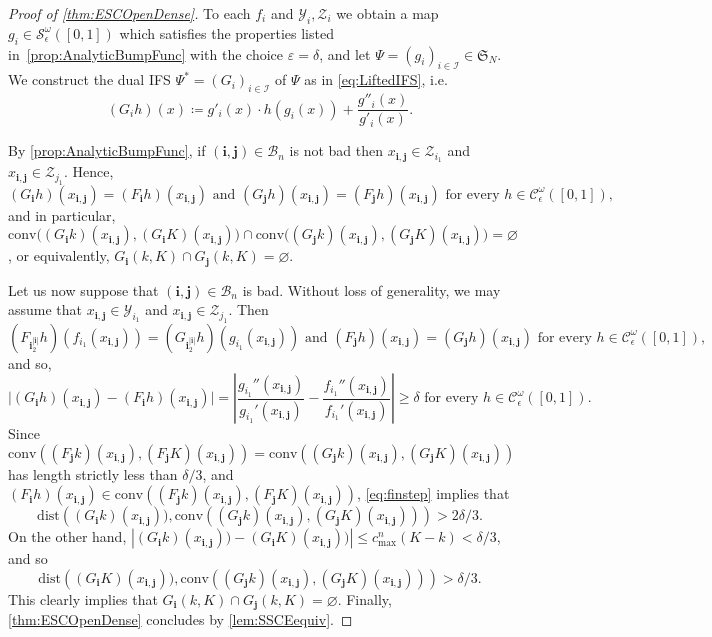 \documentclass[11pt,]{article}
\def\cref#1{\ref{#1}}%
\theoremstyle{definition}
\theoremstyle{remark}
\newcommand{\0}{\mathbf{0}}
\newcommand{\bi}{\mathbf{i}}
\newcommand{\bj}{\mathbf{j}}
\begin{document}
\begin{proof}[Proof of \cref{thm:ESCOpenDense}]
To each $f_i$ and $\mathcal{Y}_i, \mathcal{Z}_i$ we obtain a map $g_i\in\mathcal{S}_\epsilon^\omega([0,1])$ which satisfies the properties
listed in~\cref{prop:AnalyticBumpFunc} with the choice $\varepsilon=\delta$, and let $\Psi=(g_i)_{i\in\mathcal{I}}\in\mathfrak{S}_N$. We construct the dual IFS $\Psi^*=(G_i)_{i\in\mathcal{I}}$ of $\Psi$ as in \cref{eq:LiftedIFS}, i.e. 
\begin{equation*}
(G_ih)(x)\coloneqq g'_i(x)\cdot h(g_i(x)) + \frac{g''_i(x)}{g'_i(x)}.
\end{equation*}

By \cref{prop:AnalyticBumpFunc}, if $(\bi,\bj)\in\mathcal{B}_n$ is not bad then $x_{\bi,\bj}\in\mathcal{Z}_{i_1}$ and $x_{\bi,\bj}\in\mathcal{Z}_{j_1}$. Hence,
\begin{equation*}
(G_{\bi}h)(x_{\bi,\bj})=(F_{\bi}h)(x_{\bi,\bj}) \text{ and } (G_{\bj}h)(x_{\bi,\bj})=(F_{\bj}h)(x_{\bi,\bj})\text{ for every }h\in\mathcal{C}_\epsilon^\omega([0,1]),
\end{equation*}
and in particular, $\mathrm{conv}\big((G_{\bi}k)(x_{\bi,\bj}), (G_{\bi}K)(x_{\bi,\bj})\big) \cap \mathrm{conv}\big((G_{\bj}k)(x_{\bi,\bj}),
(G_{\bj}K)(x_{\bi,\bj})\big)=\varnothing$, or equivalently, $G_{\bi}(k,K)\cap G_{\bj}(k,K)=\varnothing$.

Let us now suppose that $(\bi,\bj)\in\mathcal{B}_n$ is bad. Without loss of generality, we may assume that $x_{\bi,\bj}\in\mathcal{Y}_{i_1}$ and $x_{\bi,\bj}\in\mathcal{Z}_{j_1}$. Then
\begin{equation*}
	(F_{\bi_2^{|\bi|}}h)(f_{i_1}(x_{\bi,\bj}))=(G_{\bi_2^{|\bi|}}h)(g_{i_1}(x_{\bi,\bj})) \text{ and } (F_{\bj}h)(x_{\bi,\bj})=(G_{\bj}h)(x_{\bi,\bj})\text{ for every }h\in\mathcal{C}_\epsilon^\omega([0,1]),
\end{equation*}
and so,
\begin{equation}\label{eq:finstep}
\big|(G_{\bi}h)(x_{\bi,\bj})-(F_{\bi}h)(x_{\bi,\bj})\big| = \left|
\frac{g_{i_1}''(x_{\bi,\bj})}{g_{i_1}'(x_{\bi,\bj})} -
\frac{f_{i_1}''(x_{\bi,\bj})}{f_{i_1}'(x_{\bi,\bj})} \right|\geq \delta\text{ for every }h\in\mathcal{C}_\epsilon^\omega([0,1]).
\end{equation}
Since $\mathrm{conv}\left((F_{\bj}k)(x_{\bi,\bj}),(F_{\bj}K)(x_{\bi,\bj})\right)=\mathrm{conv}\left((G_{\bj}k)(x_{\bi,\bj}),(G_{\bj}K)(x_{\bi,\bj})\right)$ has length strictly less than $\delta/3$, and $(F_{\bi}h)(x_{\bi,\bj})\in\mathrm{conv}\left((F_{\bj}k)(x_{\bi,\bj}),(F_{\bj}K)(x_{\bi,\bj})\right)$, \cref{eq:finstep} implies that 
$$
\mathrm{dist}\left((G_{\bi}k)(x_{\bi,\bj})),\mathrm{conv}\left((G_{\bj}k)(x_{\bi,\bj}),(G_{\bj}K)(x_{\bi,\bj})\right)\right)>2\delta/3. 
$$
On the other hand, $|(G_{\bi}k)(x_{\bi,\bj}))-(G_{\bi}K)(x_{\bi,\bj}))|\leq c_{\max}^n(K-k)<\delta/3$, and so 
$$
\mathrm{dist}\left((G_{\bi}K)(x_{\bi,\bj})),\mathrm{conv}\left((G_{\bj}k)(x_{\bi,\bj}),(G_{\bj}K)(x_{\bi,\bj})\right)\right)>\delta/3. 
$$
This clearly implies that  $G_{\bi}(k,K)\cap G_{\bj}(k,K)=\varnothing$. Finally, \cref{thm:ESCOpenDense} concludes by \cref{lem:SSCEequiv}.   
\end{proof}
\end{document}
